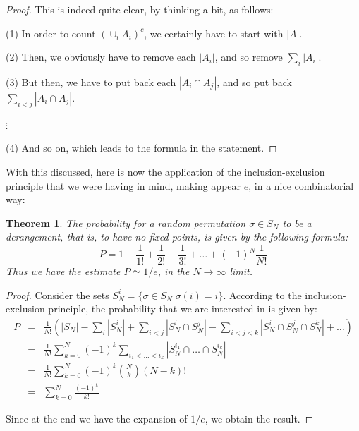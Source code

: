 \documentclass[12pt]{amsbook}
\newtheorem{theorem}{Theorem}[chapter]
\begin{document}
\begin{proof}
This is indeed quite clear, by thinking a bit, as follows:

\medskip

(1) In order to count $(\cup_iA_i)^c$, we certainly have to start with $|A|$.

\medskip

(2) Then, we obviously have to remove each $|A_i|$, and so remove $\sum_i|A_i|$.

\medskip

(3) But then, we have to put back each $|A_i\cap A_j|$, and so put back $\sum_{i<j}|A_i\cap A_j|$.

\medskip

$\vdots$

\medskip

(4) And so on, which leads to the formula in the statement.
\end{proof}

With this discussed, here is now the application of the inclusion-exclusion principle that we were having in mind, making appear $e$, in a nice combinatorial way:


\begin{theorem}
The probability for a random permutation $\sigma\in S_N$ to be a derangement, that is, to have no fixed points, is given by the following formula:
$$P=1-\frac{1}{1!}+\frac{1}{2!}-\frac{1}{3!}+\ldots+(-1)^N\frac{1}{N!}$$
Thus we have the estimate $P\simeq1/e$, in the $N\to\infty$ limit.
\end{theorem}

\begin{proof}
Consider the sets $S_N^i=\{\sigma\in S_N|\sigma(i)=i\}$. According to the inclusion-exclusion principle, the probability that we are interested in is given by:
\begin{eqnarray*}
P
&=&\frac{1}{N!}\left(|S_N|-\sum_i|S_N^i|+\sum_{i<j}|S_N^i\cap S_N^j|-\sum_{i<j<k}|S_N^i\cap S_N^j\cap S_N^k|+\ldots\right)\\
&=&\frac{1}{N!}\sum_{k=0}^N(-1)^k\sum_{i_1<\ldots<i_k}|S_N^{i_1}\cap\ldots\cap S_N^{i_k}|\\
&=&\frac{1}{N!}\sum_{k=0}^N(-1)^k\binom{N}{k}(N-k)!\\
&=&\sum_{k=0}^N\frac{(-1)^k}{k!}
\end{eqnarray*}

Since at the end we have the expansion of $1/e$, we obtain the result.
\end{proof}
\end{document}

